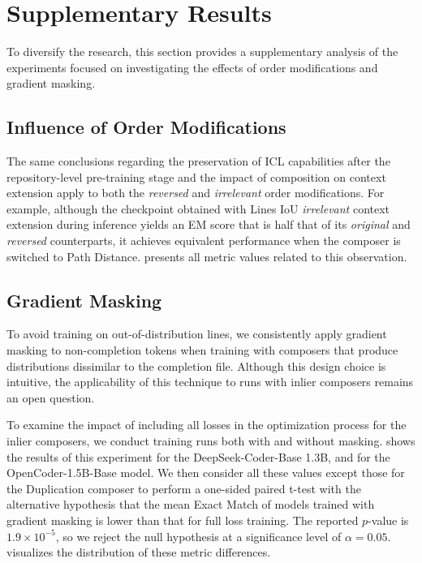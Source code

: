 \section{Supplementary Results}

To diversify the research, this section provides a supplementary analysis of the experiments focused on investigating the effects of order modifications and gradient masking.

\subsection{Influence of Order Modifications}

The same conclusions regarding the preservation of ICL capabilities after the repository-level pre-training stage and the impact of composition on context extension apply to both the \textit{reversed} and \textit{irrelevant} order modifications. For example, although the checkpoint obtained with Lines IoU \textit{irrelevant} context extension during inference yields an EM score that is half that of its \textit{original} and \textit{reversed} counterparts, it achieves equivalent performance when the composer is switched to Path Distance.  presents all metric values related to this observation.

\subsection{Gradient Masking}\label{sec:gradient-masking}

To avoid training on out-of-distribution lines, we consistently apply gradient masking to non-completion tokens when training with composers that produce distributions dissimilar to the completion file. Although this design choice is intuitive, the applicability of this technique to runs with inlier composers remains an open question.

To examine the impact of including all losses in the optimization process for the inlier composers, we conduct training runs both with and without masking.  shows the results of this experiment for the DeepSeek-Coder-Base 1.3B, and  for the OpenCoder-1.5B-Base model. We then consider all these values except those for the Duplication composer to perform a one-sided paired t-test with the alternative hypothesis that the mean Exact Match of models trained with gradient masking is lower than that for full loss training. The reported \(p\)-value is \(1.9 \times 10^{-5}\), so we reject the null hypothesis at a significance level of \(\alpha = 0.05\).  visualizes the distribution of these metric differences.

